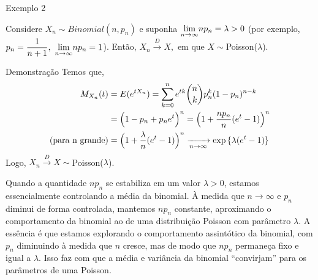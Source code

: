 \documentclass[12pt]{beamer}
\begin{document}
\begin{frame}{Exemplo 2}
	\vspace{-0.5cm}
\begin{block}{}
\justifying
Considere $X_{n}\sim Binomial(n,p_{n})$ e suponha ${\displaystyle {\displaystyle \lim_{n\to\infty}} np_{n}=\lambda>0}$ (por exemplo, $p_{n}=\dfrac{1}{n+1},~{\displaystyle \lim_{n\to\infty}} np_{n}=1$). Então, $X_{n} \overset{D}{\rightarrow} X,$ em que $X\sim$Poisson($\lambda$).
\end{block}
\pause
	\vspace{-0.3cm}
\begin{block}{Demonstração}
\justifying
Temos que,
\begin{align*}
    M_{X_{n}}(t)&=E(e^{tX_{n}})={\displaystyle \sum_{k=0}^{n}e^{tk}\binom{n}{k}p_{n}^{k}(1-p_{n})^{n-k}}\\
    &=\Big(1-p_{n}+p_{n}e^{t}\Big)^{n}=\Big(1+\dfrac{np_{n}}{n}(e^{t}-1)\Big)^{n}\\
\text{(para n grande)}    &=\Big(1+\dfrac{\lambda}{n}(e^{t}-1)\Big)^{n}\xrightarrow[n\rightarrow\infty]{} \exp{\{\lambda(e^{t}-1)\}}
\end{align*}
Logo, $X_{n} \overset{D}{\rightarrow} X\sim$Poisson($\lambda$).
\end{block}
\end{frame}

\begin{frame}
	\begin{block}{}
		\justifying
Quando a quantidade \( np_n \) se estabiliza em um valor \( \lambda > 0 \), estamos essencialmente controlando a média da binomial. À medida que \( n \to \infty \) e \( p_n \) diminui de forma controlada, mantemos \( np_n \) constante, aproximando o comportamento da binomial ao de uma distribuição Poisson com parâmetro \( \lambda \). A essência é que estamos explorando o comportamento assintótico da binomial, com \( p_n \) diminuindo à medida que \( n \) cresce, mas de modo que \( np_n \) permaneça fixo e igual a \( \lambda \). Isso faz com que a média e variância da binomial ``convirjam'' para os parâmetros de uma Poisson.


	\end{block}
\end{frame}
\end{document}
